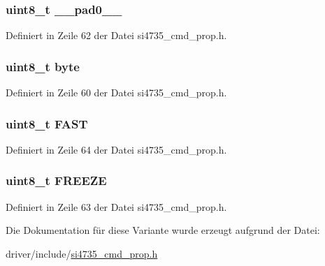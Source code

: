 \subsubsection[{\+\_\+\+\_\+pad0\+\_\+\+\_\+}]{\setlength{\rightskip}{0pt plus 5cm}uint8\+\_\+t \+\_\+\+\_\+pad0\+\_\+\+\_\+}\label{unionfm__tune__freq__arg1_a8b4eebe79ded0459acec2f4950102ba3}


Definiert in Zeile 62 der Datei si4735\+\_\+cmd\+\_\+prop.\+h.

\hypertarget{unionfm__tune__freq__arg1_a96f44d20f1dbf1c8785a7bc99a46164c}{}
\subsubsection[{byte}]{\setlength{\rightskip}{0pt plus 5cm}uint8\+\_\+t byte}\label{unionfm__tune__freq__arg1_a96f44d20f1dbf1c8785a7bc99a46164c}


Definiert in Zeile 60 der Datei si4735\+\_\+cmd\+\_\+prop.\+h.

\hypertarget{unionfm__tune__freq__arg1_a9c324e733ff424944c675beaff57049d}{}
\subsubsection[{F\+A\+S\+T}]{\setlength{\rightskip}{0pt plus 5cm}uint8\+\_\+t F\+A\+S\+T}\label{unionfm__tune__freq__arg1_a9c324e733ff424944c675beaff57049d}


Definiert in Zeile 64 der Datei si4735\+\_\+cmd\+\_\+prop.\+h.

\hypertarget{unionfm__tune__freq__arg1_af55f9b26a88028338a2a761649cf5407}{}
\subsubsection[{F\+R\+E\+E\+Z\+E}]{\setlength{\rightskip}{0pt plus 5cm}uint8\+\_\+t F\+R\+E\+E\+Z\+E}\label{unionfm__tune__freq__arg1_af55f9b26a88028338a2a761649cf5407}


Definiert in Zeile 63 der Datei si4735\+\_\+cmd\+\_\+prop.\+h.



Die Dokumentation für diese Variante wurde erzeugt aufgrund der Datei\+:\begin{DoxyCompactItemize}
\item 
driver/include/\hyperlink{si4735__cmd__prop_8h}{si4735\+\_\+cmd\+\_\+prop.\+h}\end{DoxyCompactItemize}
